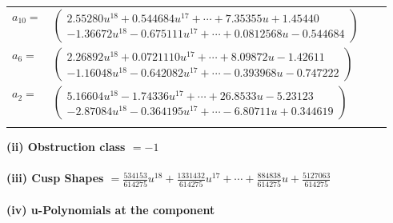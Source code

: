 \documentclass[1p]{elsarticle_modified}
\theoremstyle{definition}
\begin{document}
\begin{tabular}{m{7pt} m{180pt} m{7pt} m{180pt} }
\flushright $a_{10}=$&$\begin{pmatrix}2.55280 u^{18}+0.544684 u^{17}+\cdots+7.35355 u+1.45440\\-1.36672 u^{18}-0.675111 u^{17}+\cdots+0.0812568 u-0.544684\end{pmatrix}$ \\
\flushright $a_{6}=$&$\begin{pmatrix}2.26892 u^{18}+0.0721110 u^{17}+\cdots+8.09872 u-1.42611\\-1.16048 u^{18}-0.642082 u^{17}+\cdots-0.393968 u-0.747222\end{pmatrix}$ \\
\flushright $a_{2}=$&$\begin{pmatrix}5.16604 u^{18}-1.74336 u^{17}+\cdots+26.8533 u-5.23123\\-2.87084 u^{18}-0.364195 u^{17}+\cdots-6.80711 u+0.344619\end{pmatrix}$\\&\end{tabular}
\flushleft \textbf{(ii) Obstruction class $= -1$}\\~\\
\flushleft \textbf{(iii) Cusp Shapes $= \frac{534153}{614275} u^{18}+\frac{1331432}{614275} u^{17}+\cdots+\frac{884838}{614275} u+\frac{5127063}{614275}$}\\~\\
\newpage\renewcommand{\arraystretch}{1}
\flushleft \textbf{(iv) u-Polynomials at the component}\newline \\
\end{document}
